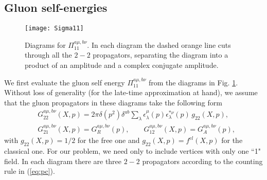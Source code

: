 \documentclass[onecolumn,showpacs,nobibnotes,nofootinbib,12pt,aps,prd,showpacs,notitlepage,nofootinbib,preprintnumbers,amsmath,amssymb]{article}
\begin{document}

\subsection{Gluon self-energies}


\begin{figure}
\begin{center}
\texttt{[image: Sigma11]}
\end{center}
\caption[*]{Diagrams for $\Pi_{11}^{a\mu,b\nu}$. In each diagram the
  dashed orange line cuts through all the $2-2$ propagators,
  separating the diagram into a product of an amplitude and a complex
  conjugate amplitude.}
\label{fig:Pi11}
\end{figure}



We first evaluate the gluon self energy $\Pi_{11}^{a\mu,b\nu}$ from
the diagrams in Fig. \ref{fig:Pi11}. Without loss of generality (for
the late-time approximation at hand), we assume that the gluon
propagators in these diagrams take the following form
\begin{align}
  &G_{22}^{a\mu,b\nu}(X,p)=2\pi \delta(p^2) \delta^{ab} \sum_\lambda \epsilon_\lambda^\mu(p) \epsilon_{\lambda}^{*\nu}(p) \, g_{22}(X,p),\nonumber\\
  &G_{21}^{a\mu,b\nu}(X,p)=G_R^{a\mu,b\nu}(p),\qquad
  G_{12}^{a\mu,b\nu}(X,p)=G_A^{a\mu,b\nu}(p),\label{eq:Ganzatz}
\end{align}
with $g_{22}(X,p)=1/2$ for the free one and $g_{22}(X,p)=f^{cl}(X,p)$
for the classical one. For our problem, we need only to include
vertices with only one ``1" field. In each diagram there are three
$2-2$ propagators according to the counting rule in (\ref{eq:pc}).
\end{document}
